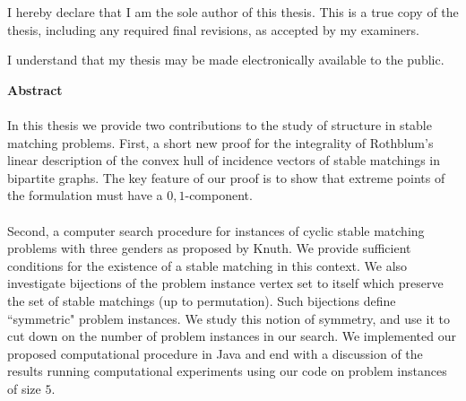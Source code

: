 \cleardoublepage %
 


  \noindent
I hereby declare that I am the sole author of this thesis. This is a true copy of the thesis, including any required final revisions, as accepted by my examiners.

  \bigskip
  
  \noindent
I understand that my thesis may be made electronically available to the public.

\cleardoublepage


\begin{center}\textbf{Abstract}\end{center}

\paragraph{}
In this thesis we provide two contributions to the study of structure in stable matching problems. First, a short new proof for the integrality of
  Rothblum's linear description of the convex hull of incidence
  vectors of stable matchings in bipartite graphs. The key feature of our proof is to show
  that extreme points of the formulation must have a $0,1$-component. 
  \paragraph{}
  Second, a computer search procedure for instances of cyclic stable matching problems with three genders as proposed by Knuth. We provide sufficient conditions for the existence of a stable matching in this context. We also investigate bijections of the problem instance vertex set to itself which preserve the set of stable matchings (up to permutation). Such bijections define ``symmetric" problem instances. We study this notion of symmetry, and use it to cut down on the number of problem instances in our search. We implemented our proposed computational procedure in Java and end with a discussion of the results running computational experiments using our code on problem instances of size $5$.
\cleardoublepage

